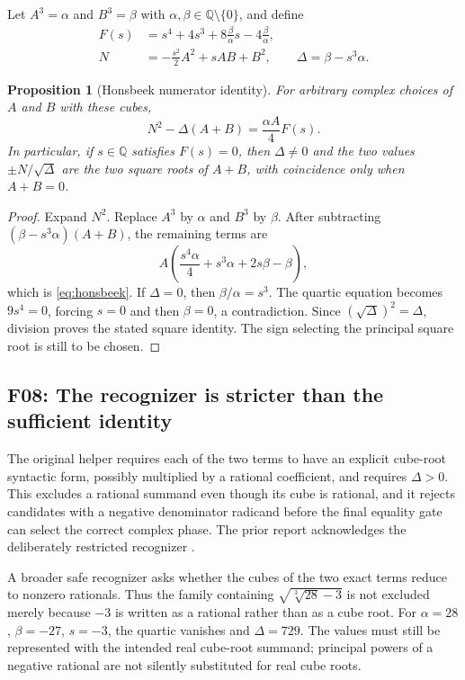 \documentclass[11pt,letterpaper]{article}
\numberwithin{equation}{section}
\newtheorem{proposition}[theorem]{Proposition}
\theoremstyle{definition}\newtheorem{definition}[theorem]{Definition}
\theoremstyle{remark}\newtheorem{remark}[theorem]{Remark}
\newcommand{\Q}{\mathbb Q}\newcommand{\C}{\mathbb C}\newcommand{\R}{\mathbb R}\newcommand{\Z}{\mathbb Z}
\newcommand{\finding}[2]{\subsection{#1: #2}}
\begin{document}
Let $A^3=\alpha$ and $B^3=\beta$ with $\alpha,\beta\in\Q\setminus\{0\}$, and define
\begin{align}
F(s)&=s^4+4s^3+8\frac\beta\alpha s-4\frac\beta\alpha,\\
N&=-\frac{s^2}{2}A^2+sAB+B^2,\qquad
\Delta=\beta-s^3\alpha.
\end{align}
\begin{proposition}[Honsbeek numerator identity]
For arbitrary complex choices of $A$ and $B$ with these cubes,
\begin{equation}
N^2-\Delta(A+B)=\frac{\alpha A}{4}F(s).
\label{eq:honsbeek}
\end{equation}
In particular, if $s\in\Q$ satisfies $F(s)=0$, then $\Delta\ne0$ and the two values $\pm N/\sqrt\Delta$ are the two square roots of $A+B$, with coincidence only when $A+B=0$.
\end{proposition}
\begin{proof}
Expand $N^2$. Replace $A^3$ by $\alpha$ and $B^3$ by $\beta$. After subtracting $(\beta-s^3\alpha)(A+B)$, the remaining terms are
\[
A\left(\frac{s^4\alpha}{4}+s^3\alpha+2s\beta-\beta\right),
\]
which is \eqref{eq:honsbeek}. If $\Delta=0$, then $\beta/\alpha=s^3$. The quartic equation becomes $9s^4=0$, forcing $s=0$ and then $\beta=0$, a contradiction. Since $(\sqrt\Delta)^2=\Delta$, division proves the stated square identity. The sign selecting the principal square root is still to be chosen.
\end{proof}

\finding{F08}{The recognizer is stricter than the sufficient identity}
The original helper requires each of the two terms to have an explicit cube-root syntactic form, possibly multiplied by a rational coefficient, and requires $\Delta>0$. This excludes a rational summand even though its cube is rational, and it rejects candidates with a negative denominator radicand before the final equality gate can select the correct complex phase. The prior report acknowledges the deliberately restricted recognizer \cite{prior}.

A broader safe recognizer asks whether the cubes of the two exact terms reduce to nonzero rationals. Thus the family containing $\sqrt{\sqrt[3]{28}-3}$ is not excluded merely because $-3$ is written as a rational rather than as a cube root. For $\alpha=28$, $\beta=-27$, $s=-3$, the quartic vanishes and $\Delta=729$. The values must still be represented with the intended real cube-root summand; principal powers of a negative rational are not silently substituted for real cube roots.
\end{document}
